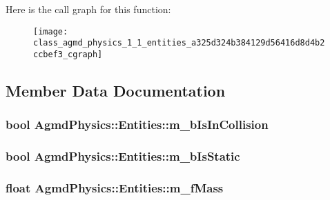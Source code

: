 Here is the call graph for this function\+:\nopagebreak
\begin{figure}[H]
\begin{center}
\leavevmode
\texttt{[image: class\_agmd\_physics\_1\_1\_entities\_a325d324b384129d56416d8d4b2ccbef3\_cgraph]}
\end{center}
\end{figure}




\subsection{Member Data Documentation}
\hypertarget{class_agmd_physics_1_1_entities_a1aee4b86e0d0581762fb330c8c1590a1}{
\subsubsection[{m\+\_\+b\+Is\+In\+Collision}]{\setlength{\rightskip}{0pt plus 5cm}bool Agmd\+Physics\+::\+Entities\+::m\+\_\+b\+Is\+In\+Collision\hspace{0.3cm}{\ttfamily [protected]}}}\label{class_agmd_physics_1_1_entities_a1aee4b86e0d0581762fb330c8c1590a1}
\hypertarget{class_agmd_physics_1_1_entities_a752cffda46ba14ebdea1e06bc2e0f5ed}{
\subsubsection[{m\+\_\+b\+Is\+Static}]{\setlength{\rightskip}{0pt plus 5cm}bool Agmd\+Physics\+::\+Entities\+::m\+\_\+b\+Is\+Static\hspace{0.3cm}{\ttfamily [protected]}}}\label{class_agmd_physics_1_1_entities_a752cffda46ba14ebdea1e06bc2e0f5ed}
\hypertarget{class_agmd_physics_1_1_entities_ab5d30f6bed76e25f47a5c9d782dbd6ee}{
\subsubsection[{m\+\_\+f\+Mass}]{\setlength{\rightskip}{0pt plus 5cm}float Agmd\+Physics\+::\+Entities\+::m\+\_\+f\+Mass\hspace{0.3cm}{\ttfamily [protected]}}}\label{class_agmd_physics_1_1_entities_ab5d30f6bed76e25f47a5c9d782dbd6ee}

